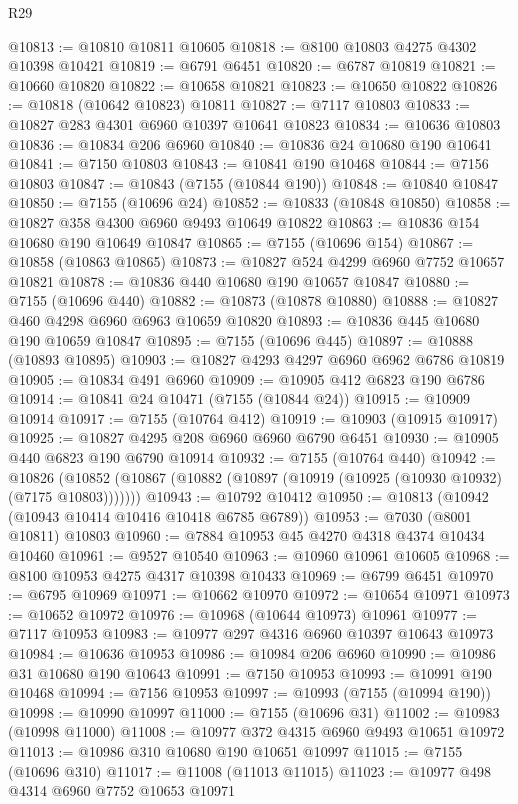 \begin{lexlean}{R29}
\begin{coremodule}
@10813 := @10810 @10811 @10605
@10818 := @8100 @10803 @4275 @4302 @10398 @10421
@10819 := @6791 @6451
@10820 := @6787 @10819
@10821 := @10660 @10820
@10822 := @10658 @10821
@10823 := @10650 @10822
@10826 := @10818 (@10642 @10823) @10811
@10827 := @7117 @10803
@10833 := @10827 @283 @4301 @6960 @10397 @10641 @10823
@10834 := @10636 @10803
@10836 := @10834 @206 @6960
@10840 := @10836 @24 @10680 @190 @10641
@10841 := @7150 @10803
@10843 := @10841 @190 @10468
@10844 := @7156 @10803
@10847 := @10843 (@7155 (@10844 @190))
@10848 := @10840 @10847
@10850 := @7155 (@10696 @24)
@10852 := @10833 (@10848 @10850)
@10858 := @10827 @358 @4300 @6960 @9493 @10649 @10822
@10863 := @10836 @154 @10680 @190 @10649 @10847
@10865 := @7155 (@10696 @154)
@10867 := @10858 (@10863 @10865)
@10873 := @10827 @524 @4299 @6960 @7752 @10657 @10821
@10878 := @10836 @440 @10680 @190 @10657 @10847
@10880 := @7155 (@10696 @440)
@10882 := @10873 (@10878 @10880)
@10888 := @10827 @460 @4298 @6960 @6963 @10659 @10820
@10893 := @10836 @445 @10680 @190 @10659 @10847
@10895 := @7155 (@10696 @445)
@10897 := @10888 (@10893 @10895)
@10903 := @10827 @4293 @4297 @6960 @6962 @6786 @10819
@10905 := @10834 @491 @6960
@10909 := @10905 @412 @6823 @190 @6786
@10914 := @10841 @24 @10471 (@7155 (@10844 @24))
@10915 := @10909 @10914
@10917 := @7155 (@10764 @412)
@10919 := @10903 (@10915 @10917)
@10925 := @10827 @4295 @208 @6960 @6960 @6790 @6451
@10930 := @10905 @440 @6823 @190 @6790 @10914
@10932 := @7155 (@10764 @440)
@10942 := @10826
    (@10852 (@10867 (@10882 (@10897 (@10919 (@10925 (@10930 @10932) (@7175 @10803)))))))
@10943 := @10792 @10412
@10950 := @10813 (@10942 (@10943 @10414 @10416 @10418 @6785 @6789))
@10953 := @7030 (@8001 @10811) @10803
@10960 := @7884 @10953 @45 @4270 @4318 @4374 @10434 @10460
@10961 := @9527 @10540
@10963 := @10960 @10961 @10605
@10968 := @8100 @10953 @4275 @4317 @10398 @10433
@10969 := @6799 @6451
@10970 := @6795 @10969
@10971 := @10662 @10970
@10972 := @10654 @10971
@10973 := @10652 @10972
@10976 := @10968 (@10644 @10973) @10961
@10977 := @7117 @10953
@10983 := @10977 @297 @4316 @6960 @10397 @10643 @10973
@10984 := @10636 @10953
@10986 := @10984 @206 @6960
@10990 := @10986 @31 @10680 @190 @10643
@10991 := @7150 @10953
@10993 := @10991 @190 @10468
@10994 := @7156 @10953
@10997 := @10993 (@7155 (@10994 @190))
@10998 := @10990 @10997
@11000 := @7155 (@10696 @31)
@11002 := @10983 (@10998 @11000)
@11008 := @10977 @372 @4315 @6960 @9493 @10651 @10972
@11013 := @10986 @310 @10680 @190 @10651 @10997
@11015 := @7155 (@10696 @310)
@11017 := @11008 (@11013 @11015)
@11023 := @10977 @498 @4314 @6960 @7752 @10653 @10971

\end{coremodule}
\end{lexlean}
